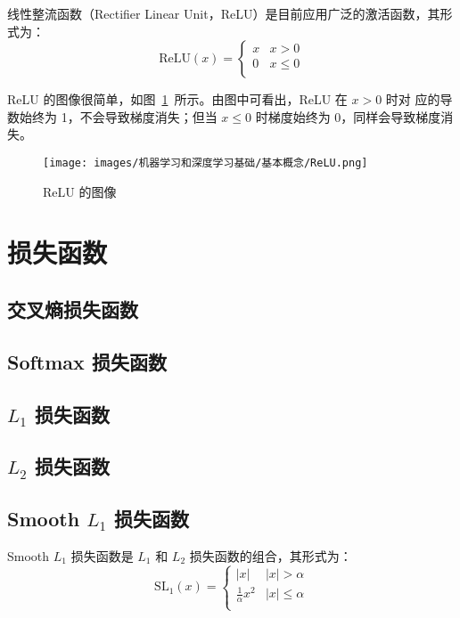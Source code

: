 线性整流函数（Rectifier Linear Unit，ReLU）是目前应用广泛的激活函数，其形式为：
\begin{equation}
  \label{equ:ReLU}
  \mathrm{ReLU}(x) = \left\{
    \begin{array}{lr}
      x & x > 0 \\
      0 & x \leq 0 \\
    \end{array}
  \right.
\end{equation}

ReLU 的图像很简单，如图~\ref{fig:ReLU}~所示。由图中可看出，ReLU 在 $x > 0$ 时对
应的导数始终为 1，不会导致梯度消失；但当 $x \leq 0$ 时梯度始终为 0，同样会导致梯度消失。

\begin{figure}[ht]
  \centering
  \texttt{[image: images/机器学习和深度学习基础/基本概念/ReLU.png]}
  \caption{ReLU 的图像}
  \label{fig:ReLU}
\end{figure}

\section{损失函数}

\subsection{交叉熵损失函数}

\subsection{Softmax 损失函数}

\subsection{$L_1$ 损失函数}

\subsection{$L_2$ 损失函数}

\subsection{Smooth $L_1$ 损失函数}
Smooth $L_1$ 损失函数是 $L_1$ 和 $L_2$ 损失函数的组合，其形式为：
\begin{equation}
  \label{equ:SmoothL1}
  \mathrm{SL}_1(x) = \left\{
    \begin{array}{lr}
      |x| & |x| > \alpha \\
      \frac{1}{\alpha} x^2 & |x| \leq \alpha \\
    \end{array}
  \right.
\end{equation}

